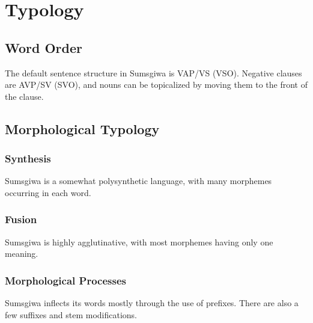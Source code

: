 \section{Typology}

\subsection{Word Order}
The default sentence structure in Sumsgiwa is VAP/VS (VSO). Negative clauses are AVP/SV (SVO), and nouns can be topicalized by moving them to the front of the clause.

\subsection{Morphological Typology}

\subsubsection{Synthesis}
Sumsgiwa is a somewhat polysynthetic language, with many morphemes occurring in each word.

\subsubsection{Fusion}
Sumsgiwa is highly agglutinative, with most morphemes having only one meaning.

\subsubsection{Morphological Processes}
Sumsgiwa inflects its words mostly through the use of prefixes. There are also a few suffixes and stem modifications.
